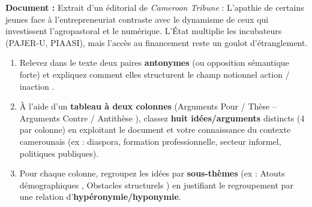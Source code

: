\documentclass[11pt]{article}
\begin{document}
\begin{exercice}
\textbf{Document :} Extrait d'un éditorial de \textit{Cameroon Tribune} : \og L'apathie de certains jeunes face à l'entrepreneuriat contraste avec le dynamisme de ceux qui investissent l'agropastoral et le numérique. L'État multiplie les incubateurs (PAJER-U, PIAASI), mais l'accès au financement reste un goulot d'étranglement. \fg{}

\begin{enumerate}
    \item Relevez dans le texte deux paires \textbf{antonymes} (ou opposition sémantique forte) et expliquez comment elles structurent le champ notionnel \og action / inaction \fg.
    \item À l'aide d'un \textbf{tableau à deux colonnes} (Arguments \og Pour / Thèse \fg{} -- Arguments \og Contre / Antithèse \fg{}), classez \textbf{huit idées/arguments} distincts (4 par colonne) en exploitant le document et votre connaissance du contexte camerounais (ex : diaspora, formation professionnelle, secteur informel, politiques publiques).
    \item Pour chaque colonne, regroupez les idées par \textbf{sous-thèmes} (ex : \og Atouts démographiques \fg, \og Obstacles structurels \fg) en justifiant le regroupement par une relation d'\textbf{hypéronymie/hyponymie}.
\end{enumerate}
\end{exercice}
\end{document}
